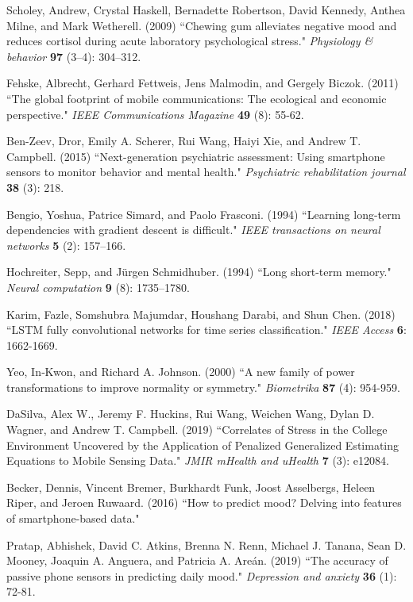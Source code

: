 \documentclass[3p,times,procedia]{elsarticle}
\begin{document}
\begin{thebibliography}{}
Scholey, Andrew, Crystal Haskell, Bernadette Robertson, David Kennedy, Anthea Milne, and Mark Wetherell. (2009) ``Chewing gum alleviates negative mood and reduces cortisol during acute laboratory psychological stress." {\it Physiology & behavior} {\bf 97} (3--4): 304--312.

Fehske, Albrecht, Gerhard Fettweis, Jens Malmodin, and Gergely Biczok. (2011) ``The global footprint of mobile communications: The ecological and economic perspective." {\it IEEE Communications Magazine} {\bf 49} (8): 55-62.

Ben-Zeev, Dror, Emily A. Scherer, Rui Wang, Haiyi Xie, and Andrew T. Campbell. (2015) ``Next-generation psychiatric assessment: Using smartphone sensors to monitor behavior and mental health." {\it Psychiatric rehabilitation journal} {\bf 38} (3): 218.

Bengio, Yoshua, Patrice Simard, and Paolo Frasconi. (1994) ``Learning long-term dependencies with gradient descent is difficult." {\it IEEE transactions on neural networks} {\bf 5} (2): 157--166.

Hochreiter, Sepp, and Jürgen Schmidhuber. (1994) ``Long short-term memory." {\it Neural computation} {\bf 9} (8): 1735--1780.

Karim, Fazle, Somshubra Majumdar, Houshang Darabi, and Shun Chen. (2018) ``LSTM fully convolutional networks for time series classification." {\it IEEE Access} {\bf 6}: 1662-1669.

Yeo, In‐Kwon, and Richard A. Johnson. (2000) ``A new family of power transformations to improve normality or symmetry." {\it Biometrika} {\bf 87} (4): 954-959.

DaSilva, Alex W., Jeremy F. Huckins, Rui Wang, Weichen Wang, Dylan D. Wagner, and Andrew T. Campbell. (2019) ``Correlates of Stress in the College Environment Uncovered by the Application of Penalized Generalized Estimating Equations to Mobile Sensing Data." {\it JMIR mHealth and uHealth} {\bf 7} (3): e12084.

Becker, Dennis, Vincent Bremer, Burkhardt Funk, Joost Asselbergs, Heleen Riper, and Jeroen Ruwaard. (2016) ``How to predict mood? Delving into features of smartphone-based data."

Pratap, Abhishek, David C. Atkins, Brenna N. Renn, Michael J. Tanana, Sean D. Mooney, Joaquin A. Anguera, and Patricia A. Areán. (2019) ``The accuracy of passive phone sensors in predicting daily mood." {\it Depression and anxiety} {\bf 36} (1): 72-81.


\end{thebibliography}
\end{document}
